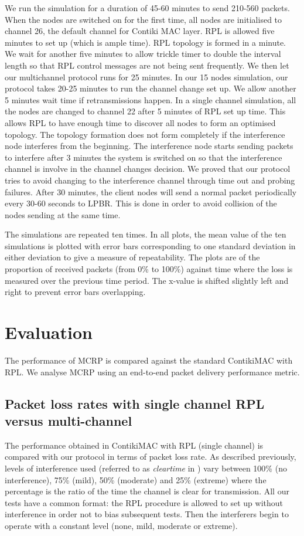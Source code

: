 We run the simulation for a duration of 45-60 minutes to send 210-560 packets. When the nodes are switched on for the first time, all nodes are initialised to channel 26, the default channel for Contiki MAC layer. RPL is allowed five minutes to set up (which is ample time). RPL topology is formed in a minute. We wait for another five minutes to allow trickle timer to double the interval length so that RPL control messages are not being sent frequently. We then let our multichannel protocol runs for 25 minutes. In our 15 nodes simulation, our protocol takes 20-25 minutes to run the channel change set up. We allow another 5 minutes wait time if retransmissions happen. 
In a single channel simulation, all the nodes are changed to channel 22 after 5 minutes of RPL set up time. This allows RPL to have enough time to discover all nodes to form an optimised topology. The topology formation does not form completely if the interference node interferes from the beginning. The interference node starts sending packets to interfere after 3 minutes the system is switched on so that the interference channel is involve in the channel changes decision. We proved that our protocol tries to avoid changing to the interference channel through time out and probing failures. After 30 minutes, the client nodes will send a normal packet periodically every 30-60 seconds to LPBR. This is done in order to avoid collision of the nodes sending at the same time. 

The simulations are repeated ten times. In all plots, the mean value of the ten simulations is plotted with error bars corresponding to one standard deviation in either deviation to give a measure of repeatability. The plots are of the proportion of received packets (from 0\% to 100\%) against time where the loss is measured over the previous time period.  The x-value is shifted slightly left and right to prevent error bars overlapping.

\section{Evaluation}
The performance of MCRP is compared against the standard ContikiMAC with RPL. We analyse MCRP using an end-to-end packet delivery performance metric.

\subsection{Packet loss rates with single channel RPL versus multi-channel}
The performance obtained in ContikiMAC with RPL (single channel) is compared with our protocol in terms of packet loss rate.
As described previously, levels of interference used (referred to as \emph{clear\textunderscore time} in \cite{Boano:2010:MSM:2127940.2127963})
vary between 100\% (no interference), 75\% (mild), 50\% (moderate) and 25\% (extreme) where the percentage is the ratio of the time the channel is clear for transmission.  All our tests have a common format: the RPL procedure is allowed to set up without interference in order not to bias subsequent tests.
Then the interferers begin to operate with a constant level (none, mild, moderate or extreme).


